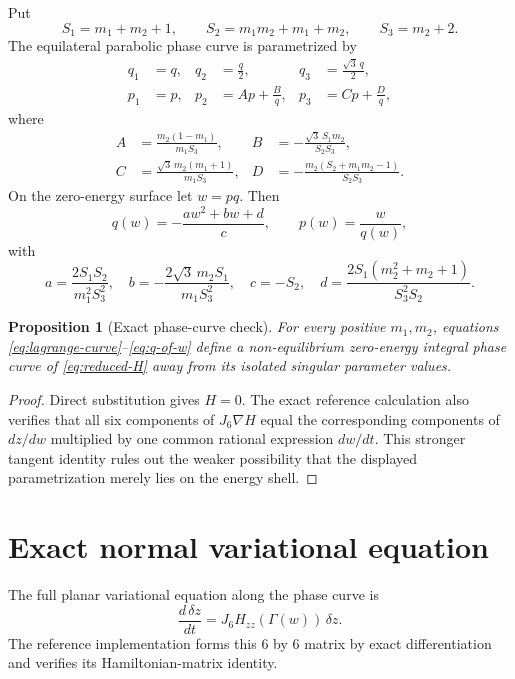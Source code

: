 \documentclass[11pt]{article}
\newtheorem{proposition}[theorem]{Proposition}
\theoremstyle{definition}
\theoremstyle{remark}
\begin{document}
Put
\[
 S_1=m_1+m_2+1,\qquad
 S_2=m_1m_2+m_1+m_2,\qquad
 S_3=m_2+2.
\]
The equilateral parabolic phase curve is parametrized by
\begin{align}
 q_1&=q,&q_2&=\frac q2,&q_3&=\frac{\sqrt3\,q}{2},\nonumber\\
 p_1&=p,&p_2&=Ap+\frac Bq,&p_3&=Cp+\frac Dq,
\label{eq:lagrange-curve}
\end{align}
where
\begin{align*}
A&=\frac{m_2(1-m_1)}{m_1S_3},&
B&=-\frac{\sqrt3\,S_1m_2}{S_2S_3},\\
C&=\frac{\sqrt3\,m_2(m_1+1)}{m_1S_3},&
D&=-\frac{m_2(S_2+m_1m_2-1)}{S_2S_3}.
\end{align*}
On the zero-energy surface let \(w=pq\).  Then
\begin{equation}
 q(w)=-\frac{aw^2+bw+d}{c},\qquad p(w)=\frac{w}{q(w)},
\label{eq:q-of-w}
\end{equation}
with
\[
 a=\frac{2S_1S_2}{m_1^2S_3^2},\quad
 b=-\frac{2\sqrt3\,m_2S_1}{m_1S_3^2},\quad
 c=-S_2,\quad
 d=\frac{2S_1(m_2^2+m_2+1)}{S_3^2S_2}.
\]

\begin{proposition}[Exact phase-curve check]
\label{prop:phase}
For every positive \(m_1,m_2\), equations
\eqref{eq:lagrange-curve}--\eqref{eq:q-of-w} define a non-equilibrium
zero-energy integral phase curve of \eqref{eq:reduced-H} away from its
isolated singular parameter values.
\end{proposition}

\begin{proof}
Direct substitution gives \(H=0\).  The exact reference calculation also
verifies that all six components of \(J_6\nabla H\) equal the corresponding
components of \(dz/dw\) multiplied by one common rational expression
\(dw/dt\).  This stronger tangent identity rules out the weaker possibility
that the displayed parametrization merely lies on the energy shell.
\end{proof}

\section{Exact normal variational equation}
\label{sec:nve}

The full planar variational equation along the phase curve is
\[
 \frac{d\,\delta z}{dt}
   =J_6 H_{zz}(\Gamma(w))\,\delta z .
\]
The reference implementation forms this \(6\) by \(6\) matrix by exact
differentiation and verifies its Hamiltonian-matrix identity.
\end{document}
